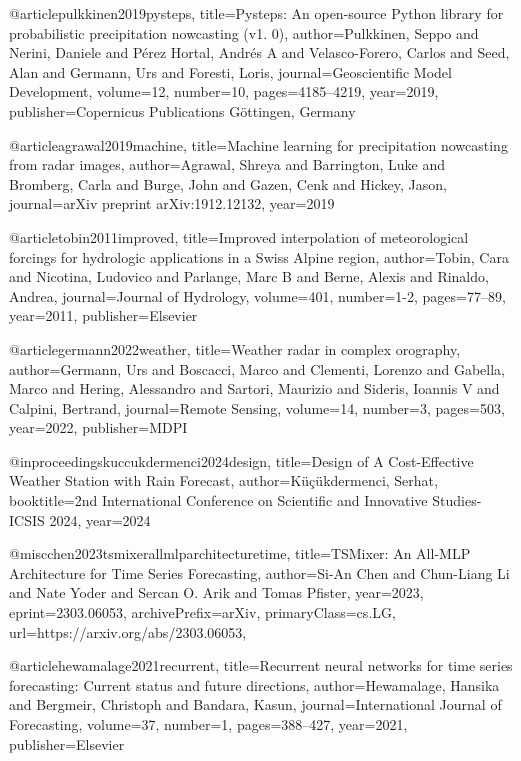 @article{pulkkinen2019pysteps,
  title={Pysteps: An open-source Python library for probabilistic precipitation nowcasting (v1. 0)},
  author={Pulkkinen, Seppo and Nerini, Daniele and P{\'e}rez Hortal, Andr{\'e}s A and Velasco-Forero, Carlos and Seed, Alan and Germann, Urs and Foresti, Loris},
  journal={Geoscientific Model Development},
  volume={12},
  number={10},
  pages={4185--4219},
  year={2019},
  publisher={Copernicus Publications G{\"o}ttingen, Germany}
}

@article{agrawal2019machine,
  title={Machine learning for precipitation nowcasting from radar images},
  author={Agrawal, Shreya and Barrington, Luke and Bromberg, Carla and Burge, John and Gazen, Cenk and Hickey, Jason},
  journal={arXiv preprint arXiv:1912.12132},
  year={2019}
}

@article{tobin2011improved,
  title={Improved interpolation of meteorological forcings for hydrologic applications in a Swiss Alpine region},
  author={Tobin, Cara and Nicotina, Ludovico and Parlange, Marc B and Berne, Alexis and Rinaldo, Andrea},
  journal={Journal of Hydrology},
  volume={401},
  number={1-2},
  pages={77--89},
  year={2011},
  publisher={Elsevier}
}

@article{germann2022weather,
  title={Weather radar in complex orography},
  author={Germann, Urs and Boscacci, Marco and Clementi, Lorenzo and Gabella, Marco and Hering, Alessandro and Sartori, Maurizio and Sideris, Ioannis V and Calpini, Bertrand},
  journal={Remote Sensing},
  volume={14},
  number={3},
  pages={503},
  year={2022},
  publisher={MDPI}
}

@inproceedings{kuccukdermenci2024design,
  title={Design of A Cost-Effective Weather Station with Rain Forecast},
  author={K{\"u}{\c{c}}{\"u}kdermenci, Serhat},
  booktitle={2nd International Conference on Scientific and Innovative Studies-ICSIS 2024},
  year={2024}
}

@misc{chen2023tsmixerallmlparchitecturetime,
      title={TSMixer: An All-MLP Architecture for Time Series Forecasting}, 
      author={Si-An Chen and Chun-Liang Li and Nate Yoder and Sercan O. Arik and Tomas Pfister},
      year={2023},
      eprint={2303.06053},
      archivePrefix={arXiv},
      primaryClass={cs.LG},
      url={https://arxiv.org/abs/2303.06053}, 
}

@article{hewamalage2021recurrent,
  title={Recurrent neural networks for time series forecasting: Current status and future directions},
  author={Hewamalage, Hansika and Bergmeir, Christoph and Bandara, Kasun},
  journal={International Journal of Forecasting},
  volume={37},
  number={1},
  pages={388--427},
  year={2021},
  publisher={Elsevier}
}

